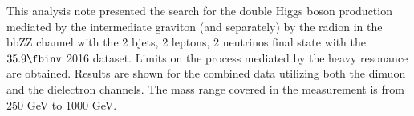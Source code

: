 This analysis note presented the search for the double Higgs boson production mediated by the intermediate graviton (and separately) by the radion in the bbZZ channel with the 2 bjets, 2 leptons, 2 neutrinos final state with the $35.9\fbinv$ 2016 dataset. Limits on the process mediated by the heavy resonance are obtained. Results are shown for the combined data utilizing both the dimuon and the dielectron channels. The mass range covered in the measurement is from 250 GeV to 1000 GeV.
